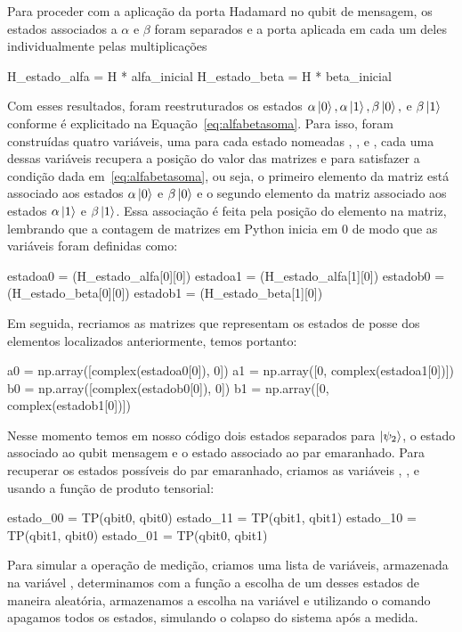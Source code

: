 Para proceder com a aplicação da porta Hadamard no qubit de mensagem, os estados associados a $\alpha$ e $\beta$ foram separados e a porta aplicada em cada um deles individualmente pelas multiplicações
\begin{pycode}
  H_estado_alfa = H * alfa_inicial
  H_estado_beta = H * beta_inicial
\end{pycode}
Com esses resultados, foram reestruturados os estados $\alpha\ket{0}, \alpha\ket{1}, \beta\ket{0},$ e $\beta\ket{1}$ conforme é explicitado na Equação~\eqref{eq:alfabetasoma}. Para isso, foram construídas quatro variáveis, uma para cada estado nomeadas , ,  e , cada uma dessas variáveis recupera a posição do valor das matrizes  e  para satisfazer a condição dada em~\eqref{eq:alfabetasoma}, ou seja, o primeiro elemento da matriz está associado aos estados $\alpha\ket{0}$ e $\beta\ket{0}$ e o segundo elemento da matriz associado aos estados $\alpha\ket{1}$ e $\beta\ket{1}$. Essa associação é feita pela posição do elemento na matriz, lembrando que a contagem de matrizes em Python inicia em 0 de modo que as variáveis foram definidas como:
\begin{pycode}
  estadoa0 = (H_estado_alfa[0][0])
  estadoa1 = (H_estado_alfa[1][0])
  estadob0 = (H_estado_beta[0][0])
  estadob1 = (H_estado_beta[1][0])
\end{pycode}
Em seguida, recriamos as matrizes que representam os estados de posse dos elementos localizados anteriormente, temos portanto:
\begin{pycode}
  a0 = np.array([complex(estadoa0[0]), 0])
  a1 = np.array([0, complex(estadoa1[0])])
  b0 = np.array([complex(estadob0[0]), 0])
  b1 = np.array([0, complex(estadob1[0])])
\end{pycode}
Nesse momento temos em nosso código dois estados separados para $\ket{\psi_2}$, o estado associado ao qubit mensagem e o estado associado ao par emaranhado. Para recuperar os estados possíveis do par emaranhado, criamos as variáveis , ,  e  usando a função de produto tensorial:
\begin{pycode}
  estado_00 = TP(qbit0, qbit0)
  estado_11 = TP(qbit1, qbit1)
  estado_10 = TP(qbit1, qbit0)
  estado_01 = TP(qbit0, qbit1)
\end{pycode}
Para simular a operação de medição, criamos uma lista de variáveis, armazenada na variável , determinamos com a função  a escolha de um desses estados de maneira aleatória, armazenamos a escolha na variável  e utilizando o comando  apagamos todos os estados, simulando o colapso do sistema após a medida.

